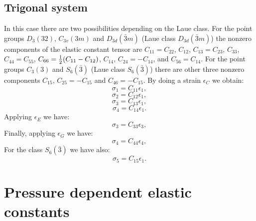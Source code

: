 \documentclass[12pt,a4paper]{article}
\begin{document}
\subsection{\color{web-blue}Trigonal system}
In this case there are two possibilities depending on the Laue class. For
the point groups $D_3(32)$, $C_{3v}(3m)$ and $D_{3d}(\bar 3m)$ (Laue class
$D_{3d}(\bar 3m)$) the nonzero components of the elastic constant tensor
are $C_{11}=C_{22}$, $C_{12}$, $C_{13}=C_{23}$, $C_{33}$, $C_{44}=C_{55}$, 
$C_{66}={1\over 2} (C_{11}-C_{12})$, $C_{14}$, $C_{24}=-C_{14}$, and 
$C_{56}=C_{14}$. For the point groups $C_3(3)$ and $S_6(\bar 3)$ (Laue
class $S_6(\bar 3)$) there are other three nonzero components $C_{15}$, 
$C_{25}=-C_{15}$ and $C_{46}=-C_{15}$. 
By doing a strain $\epsilon_C$ we obtain:
\begin{equation}
\sigma_1=C_{11} \epsilon_1,
\end{equation}
\begin{equation}
\sigma_2=C_{12} \epsilon_1,
\end{equation}
\begin{equation}
\sigma_3=C_{13} \epsilon_1,
\end{equation}
\begin{equation}
\sigma_4=C_{14} \epsilon_1.
\end{equation}
Applying $\epsilon_E$ we have:
\begin{equation}
\sigma_3=C_{33} \epsilon_3,
\end{equation}
Finally, applying $\epsilon_G$ we have:
\begin{equation}
\sigma_4=C_{44} \epsilon_4,
\end{equation}
For the class $S_6(\bar 3)$ we have also:
\begin{equation}
\sigma_5=C_{15} \epsilon_1.
\end{equation}


\newpage
\section{\color{coral}Pressure dependent elastic constants}
\end{document}
